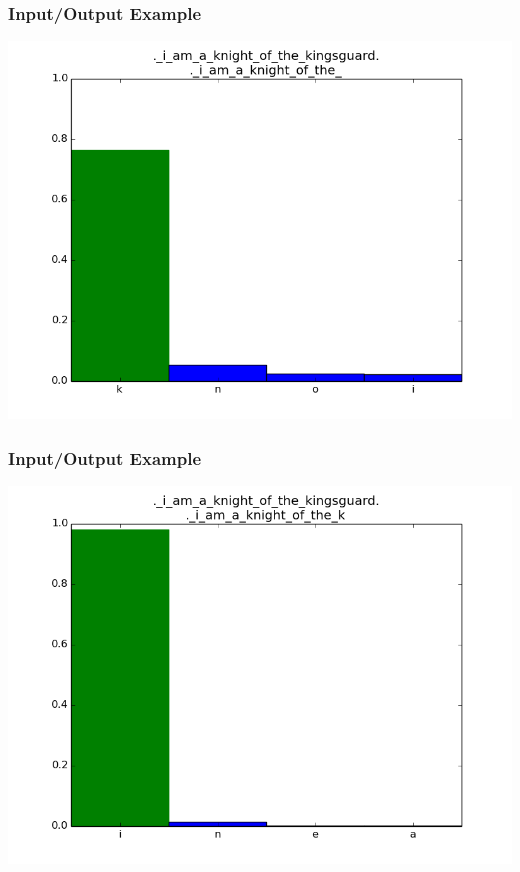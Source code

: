 \documentclass[12]{beamer}
\begin{document}
\begin{frame}
\frametitle{Input/Output Example}
\begin{center}
\includegraphics[scale=0.4]{../distplot/22.png}
\end{center}
\end{frame}

\begin{frame}
\frametitle{Input/Output Example}
\begin{center}
\includegraphics[scale=0.4]{../distplot/23.png}
\end{center}
\end{frame}
\end{document}

